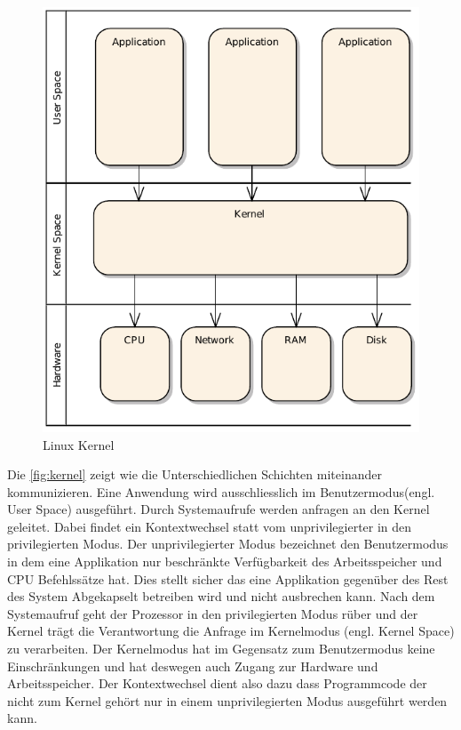 \begin{figure}
\centering
\includegraphics[scale=0.8]{images/kernel.pdf}
\caption{Linux Kernel}
\label{fig:kernel}
\end{figure}

Die \autoref{fig:kernel} zeigt wie die Unterschiedlichen Schichten miteinander kommunizieren. Eine Anwendung wird ausschliesslich im Benutzermodus(engl. User Space) ausgeführt. Durch Systemaufrufe werden anfragen an den Kernel geleitet. Dabei findet ein Kontextwechsel statt vom unprivilegierter in den privilegierten Modus. Der unprivilegierter Modus bezeichnet den Benutzermodus in dem eine Applikation nur beschränkte Verfügbarkeit des Arbeitsspeicher und CPU Befehlssätze hat. Dies stellt sicher das eine Applikation gegenüber des Rest des System Abgekapselt betreiben wird und nicht ausbrechen kann. Nach dem Systemaufruf geht der Prozessor in den privilegierten Modus rüber und der Kernel trägt die Verantwortung die Anfrage im Kernelmodus (engl. Kernel Space) zu verarbeiten. Der Kernelmodus hat im Gegensatz zum Benutzermodus keine Einschränkungen und hat deswegen auch Zugang zur Hardware und Arbeitsspeicher. Der Kontextwechsel dient also dazu dass Programmcode der nicht zum Kernel gehört nur in einem unprivilegierten Modus ausgeführt werden kann.


